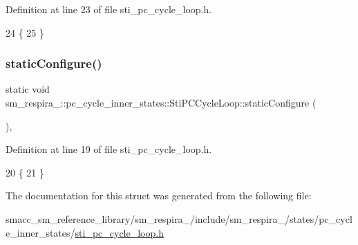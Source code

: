 Definition at line 23 of file sti\+\_\+pc\+\_\+cycle\+\_\+loop.\+h.


\begin{DoxyCode}
24   \{
25   \}
\end{DoxyCode}
\mbox{\label{structsm__respira__1_1_1pc__cycle__inner__states_1_1StiPCCycleLoop_a1bdc857b4bad937be315add541600224}} 
\subsubsection{\texorpdfstring{static\+Configure()}{staticConfigure()}}
{\footnotesize\ttfamily static void sm\+\_\+respira\+\_\+::pc\+\_\+cycle\+\_\+inner\+\_\+states\+::\+Sti\+P\+C\+Cycle\+Loop\+::static\+Configure (\begin{DoxyParamCaption}{ }\end{DoxyParamCaption})\hspace{0.3cm}{\ttfamily [inline]}, {\ttfamily [static]}}



Definition at line 19 of file sti\+\_\+pc\+\_\+cycle\+\_\+loop.\+h.


\begin{DoxyCode}
20   \{
21   \}
\end{DoxyCode}


The documentation for this struct was generated from the following file\+:\begin{DoxyCompactItemize}
\item 
smacc\+\_\+sm\+\_\+reference\+\_\+library/sm\+\_\+respira\+\_/include/sm\+\_\+respira\+\_/states/pc\+\_\+cycle\+\_\+inner\+\_\+states/\hyperlink{sti__pc__cycle__loop_8h}{sti\+\_\+pc\+\_\+cycle\+\_\+loop.\+h}\end{DoxyCompactItemize}
